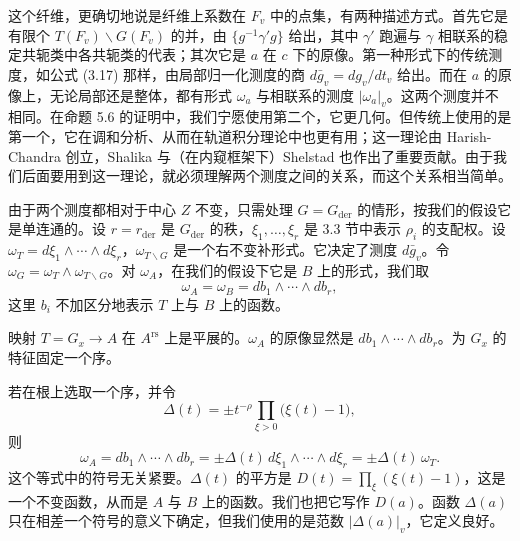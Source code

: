 这个纤维，更确切地说是纤维上系数在 $F_v$ 中的点集，有两种描述方式。首先它是有限个 $T(F_v)\backslash G(F_v)$ 的并，由 $\{g^{-1}\gamma'g\}$ 给出，其中 $\gamma'$ 跑遍与 $\gamma$ 相联系的稳定共轭类中各共轭类的代表；其次它是 $a$ 在 $c$ 下的原像。第一种形式下的传统测度，如公式 (3.17) 那样，由局部归一化测度的商 $d\bar g_v=dg_v/dt_v$ 给出。而在 $a$ 的原像上，无论局部还是整体，都有形式 $\omega_a$ 与相联系的测度 $|\omega_a|_v$。这两个测度并不相同。在命题 5.6 的证明中，我们宁愿使用第二个，它更几何。但传统上使用的是第一个，它在调和分析、从而在轨道积分理论中也更有用；这一理论由 Harish-Chandra 创立，Shalika 与（在内窥框架下）Shelstad 也作出了重要贡献。由于我们后面要用到这一理论，就必须理解两个测度之间的关系，而这个关系相当简单。

由于两个测度都相对于中心 $Z$ 不变，只需处理 $G=G_{\mathrm{der}}$ 的情形，按我们的假设它是单连通的。设 $r=r_{\mathrm{der}}$ 是 $G_{\mathrm{der}}$ 的秩，$\xi_1,\dots,\xi_r$ 是 3.3 节中表示 $\rho_i$ 的支配权。设 $\omega_T=d\xi_1\wedge\cdots\wedge d\xi_r$，$\omega_{T\backslash G}$ 是一个右不变补形式。它决定了测度 $d\bar g_v$。令 $\omega_G=\omega_T\wedge\omega_{T\backslash G}$。对 $\omega_A$，在我们的假设下它是 $B$ 上的形式，我们取
\begin{equation}\tag{3.28}
\omega_A=\omega_B=db_1\wedge\cdots\wedge db_r,
\end{equation}
这里 $b_i$ 不加区分地表示 $T$ 上与 $B$ 上的函数。

映射 $T=G_x\to A$ 在 $A^{\mathrm{rs}}$ 上是平展的。$\omega_A$ 的原像显然是 $db_1\wedge\cdots\wedge db_r$。为 $G_x$ 的特征固定一个序。

\setcounter{theorem}{28}
\begin{proposition}
若在根上选取一个序，并令
\[
\Delta(t)=\pm t^{-\rho}\prod_{\xi>0}\bigl(\xi(t)-1\bigr),
\]
则
\[
\omega_A=db_1\wedge\cdots\wedge db_r=\pm\Delta(t)\,d\xi_1\wedge\cdots\wedge d\xi_r=\pm\Delta(t)\,\omega_T.
\]
这个等式中的符号无关紧要。$\Delta(t)$ 的平方是 $D(t)=\prod_\xi(\xi(t)-1)$，这是一个不变函数，从而是 $A$ 与 $B$ 上的函数。我们也把它写作 $D(a)$。函数 $\Delta(a)$ 只在相差一个符号的意义下确定，但我们使用的是范数 $|\Delta(a)|_v$，它定义良好。\end{proposition}

